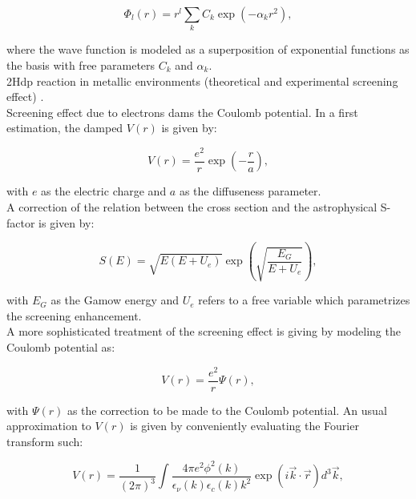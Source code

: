 \documentclass[openany]{book}
\begin{document}
\begin{equation}\label{eq:potential_variational}
	\Phi_l(r) = r^l \sum_{k} C_k \exp(-\alpha_k r^2),
\end{equation}

where the wave function is modeled as a superposition of exponential functions as the basis with free parameters $C_k$ and $\alpha_k$. \\

2Hdp reaction in metallic environments (theoretical and experimental screening effect)  \cite{czerski_huke_heide_ruprecht_2006}. \\

Screening effect due to electrons dams the Coulomb potential. In a first estimation, the damped $V(r)$ is given by:

\begin{equation}\label{eq:potential_screening_simple}
	V(r) = \frac{e^2}{r} \exp {\left( - \frac{r}{a}\right)},
\end{equation}

with $e$ as the electric charge and $a$ as the diffuseness parameter. \\

A correction of the relation between the cross section and the astrophysical S-factor is given by:

\begin{equation}\label{eq:potential_screening_sFactor}
	S(E) = \sqrt{E(E+U_e)} \exp {\left( \sqrt{\frac{E_G}{E + U_e}}\right)},
\end{equation}

with $E_G$ as the Gamow energy and $U_e$ refers to a free variable which parametrizes the screening enhancement. \\

A more sophisticated treatment of the screening effect is giving by modeling the Coulomb potential as:

\begin{equation}\label{eq:potential_screening}
	V(r) = \frac{e^2}{r} \Psi(r),
\end{equation}

with $\Psi(r)$ as the correction to be made to the Coulomb potential. An usual approximation to $V(r)$ is given by conveniently evaluating the Fourier transform such:

\begin{equation}\label{eq:potential_screening_fourier}
	V(r) = \frac{1}{(2\pi)^3} \int \frac{4\pi e^2 \phi^2(k)}{\epsilon_\nu (k) \epsilon_c (k) k^2} \exp(i \vec k \cdot \vec r) d^3 \vec k,
\end{equation}
\end{document}
